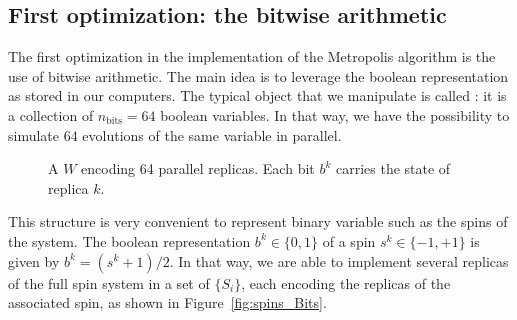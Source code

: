 \subsection{First optimization: the bitwise arithmetic}
\myindent The first optimization in the implementation of the Metropolis algorithm is the use of bitwise arithmetic. The main idea is to leverage the boolean representation as stored in our computers. The typical object that we manipulate is called \Bits: it is a collection of $n_\text{bits}=64$ boolean variables. In that way, we have the possibility to simulate $64$ evolutions of the same variable in parallel.
\begin{figure}[ht]
\centering
{}
\caption{A \Bits $W$ encoding 64 parallel replicas. Each bit $b^k$ carries the state of replica $k$.}
\label{fig:Bits}
\end{figure}

This structure is very convenient to represent binary variable such as the spins of the system. The boolean representation $b^k \in \{0,1\}$ of a spin $s^k \in \{-1,+1\}$ is given by $b^k = (s^k+1)/2$. In that way, we are able to implement several replicas of the full spin system in a set of \Bits $\{S_i\}$, each encoding the replicas of the associated spin, as shown in Figure~\ref{fig:spins_Bits}.

